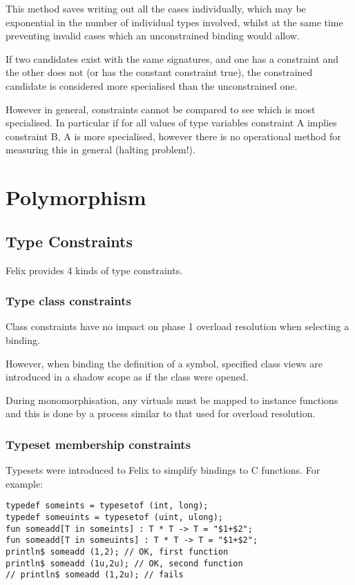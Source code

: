 \documentclass[oneside]{book}
\begin{document}
This method saves writing out all the cases individually,
which may be exponential in the number of individual types involved,
whilst at the same time preventing invalid cases which an unconstrained
binding would allow.

If two candidates exist with the same signatures, and one has
a constraint and the other does not (or has the constant constraint true),
the constrained candidate is considered more specialised than the
unconstrained one.

However in general, constraints cannot be compared to see which is
most specialised. In particular if for all values of type variables
constraint A implies constraint B, A is more specialised, however
there is no operational method for measuring this in general
(halting problem!).



\chapter{Polymorphism}
\section{Type Constraints}
\label{Type Constraints}
Felix provides 4 kinds of type constraints.
\subsection{Type class constraints}
Class constraints have no impact on phase 1 overload resolution
when selecting a binding. 

However, when binding the definition
of a symbol, specified class views are introduced in a shadow
scope as if the class were opened.

During monomorphisation, any virtuals must be mapped to instance
functions and this is done by a process similar to that used for
overload resolution. 

\subsection{Typeset membership constraints}
\label{Typeset membership constraints}
Typesets were introduced to Felix to simplify bindings to C functions.
For example:

\begin{verbatim}
typedef someints = typesetof (int, long);
typedef someuints = typesetof (uint, ulong);
fun someadd[T in someints] : T * T -> T = "$1+$2";
fun someadd[T in someuints] : T * T -> T = "$1+$2";
println$ someadd (1,2); // OK, first function
println$ someadd (1u,2u); // OK, second function
// println$ someadd (1,2u); // fails
\end{verbatim}
\end{document}
